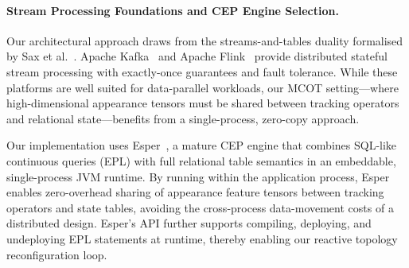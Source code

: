 \documentclass[review]{elsarticle}
\begin{document}
\paragraph{Stream Processing Foundations and CEP Engine Selection.}
Our architectural approach draws from the streams-and-tables duality formalised by Sax et al.~\cite{sax2018streams}. Apache Kafka~\cite{kreps2011kafka} and Apache Flink~\cite{carbone2015flink} provide distributed stateful stream processing with exactly-once guarantees and fault tolerance. While these platforms are well suited for data-parallel workloads, our MCOT setting---where high-dimensional appearance tensors must be shared between tracking operators and relational state---benefits from a single-process, zero-copy approach.

Our implementation uses Esper~\cite{espertech2024}, a mature CEP engine that combines SQL-like continuous queries (EPL) with full relational table semantics in an embeddable, single-process JVM runtime. By running within the application process, Esper enables zero-overhead sharing of appearance feature tensors between tracking operators and state tables, avoiding the cross-process data-movement costs of a distributed design. Esper's API further supports compiling, deploying, and undeploying EPL statements at runtime, thereby enabling our reactive topology reconfiguration loop.
\end{document}
